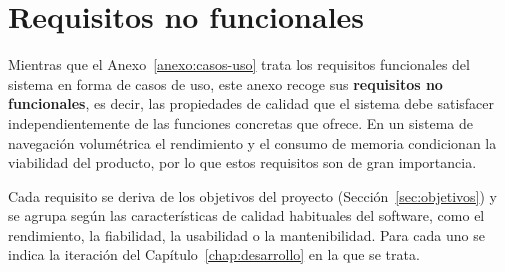 \chapter{Requisitos no funcionales}
\label{anexo:rnf}

Mientras que el Anexo~\ref{anexo:casos-uso} trata los requisitos funcionales del sistema en forma de casos de uso, este anexo recoge sus \textbf{requisitos no funcionales}, es decir, las propiedades de calidad que el sistema debe satisfacer independientemente de las funciones concretas que ofrece.
En un sistema de navegación volumétrica el rendimiento y el consumo de memoria condicionan la viabilidad del producto, por lo que estos requisitos son de gran importancia.

Cada requisito se deriva de los objetivos del proyecto (Sección~\ref{sec:objetivos}) y se agrupa según las características de calidad habituales del software, como el rendimiento, la fiabilidad, la usabilidad o la mantenibilidad.
Para cada uno se indica la iteración del Capítulo~\ref{chap:desarrollo} en la que se trata.

\medskip

